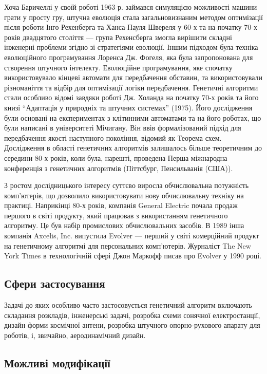 \documentclass[a4paper, 12pt]{article}
\numberwithin{equation}{section}
\begin{document}
Хоча Баричеллі у своїй роботі 1963 р. займався симуляцією можливості машини грати у просту гру, штучна еволюція стала загальновизнаним методом оптимізації після роботи Інго Рехенберга та Ханса-Пауля Швереля у 60-х та на початку 70-х років двадцятого століття — група Рехенсберга змогла вирішити складні інженерні проблеми згідно зі стратегіями еволюції. Іншим підходом була техніка еволюційного програмування Лоренса Дж. Фогеля, яка була запропонована для створення штучного інтелекту. Еволюційне програмування, яке спочатку використовувало кінцеві автомати для передбачення обставин, та використовували різноманіття та відбір для оптимізації логіки передбачення. Генетичні алгоритми стали особливо відомі завдяки роботі Дж. Холанда на початку 70-х років та його книзі ``Адаптація у природніх та штучних системах'' (1975). Його дослідження були основані на експериментах з клітинними автоматами та на його роботах, що були написані в університеті Мічигану. Він ввів формалізований підхід для передбачення якості наступного покоління, відомий як Теорема схем. Дослідження в області генетичних алгоритмів залишалось більше теоретичним до середини 80-х років, коли була, нарешті, проведена Перша міжнародна конференція з генетичних алгоритмів (Піттсбург, Пенсильванія (США)). \medskip

З ростом дослідницького інтересу суттєво виросла обчислювальна потужність комп'ютерів, що дозволило використовувати нову обчислювальну техніку на практиці. Наприкінці 80-х років, компанія General Electric почала продаж першого в світі продукту, який працював з використанням генетичного алгоритму. Це був набір промислових обчислювальних засобів. В 1989 інша компанія Axcelis, Inc. випустила Evolver --- перший у світі комерційний продукт на генетичному алгоритмі для персональних комп'ютерів. Журналіст The New York Times в технологічній сфері Джон Маркофф писав про Evolver у 1990 році.

\subsection{Сфери застосування}

Задачі до яких особливо часто застосовується генетичний алгоритм включають складання розкладів, інженерські задачі\cite{tcs13}, розробка схеми сонячної електростанції\cite{gb13}, дизайн форми космічної антени\cite{hll}, розробка штучного опорно-рухового апарату для роботів\cite{robotwalking}, і, звичайно, аеродинамічний дизайн\cite{ew17}.

\subsection{Можливі модифікації}
\end{document}
